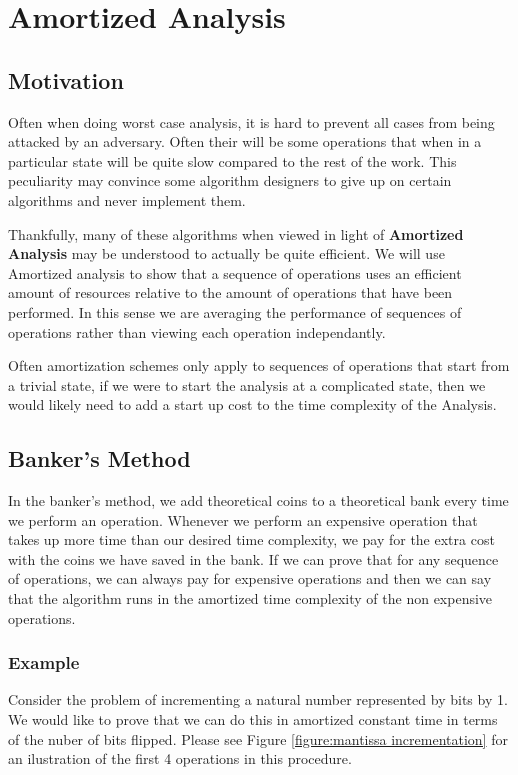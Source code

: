 \documentclass[12pt, letterpaper]{book}
\begin{document}
	\section{Amortized Analysis} \label{amortized analysis}
		\subsection{Motivation}

Often when doing worst case analysis, it is hard to prevent all cases from being attacked by an adversary. Often their will be some operations that when in a particular state will be quite slow compared to the rest of the work. This peculiarity may convince some algorithm designers to give up on certain algorithms and never implement them.

Thankfully, many of these algorithms when viewed in light of \textbf{Amortized Analysis} may be understood to actually be quite efficient. We will use Amortized analysis to show that a sequence of operations uses an efficient amount of resources relative to the amount of operations that have been performed. In this sense we are averaging the performance of sequences of operations rather than viewing each operation independantly.

Often amortization schemes only apply to sequences of operations that start from a trivial state, if we were to start the analysis at a complicated state, then we would likely need to add a start up cost to the time complexity of the Analysis.

		\subsection{Banker's Method}

	In the banker's method, we add theoretical coins to a theoretical bank every time we perform an operation. Whenever we perform an expensive operation that takes up more time than our desired time complexity, we pay for the extra cost with the coins we have saved in the bank. If we can prove that for any sequence of operations, we can always pay for expensive operations and then we can say that the algorithm runs in the amortized time complexity of the non expensive operations.

\subsubsection{Example}

	Consider the problem of incrementing a natural number represented by bits by 1. We would like to prove that we can do this in amortized constant time in terms of the nuber of bits flipped. Please see Figure \ref{figure:mantissa incrementation} for an ilustration of the first 4 operations in this procedure.
\end{document}
